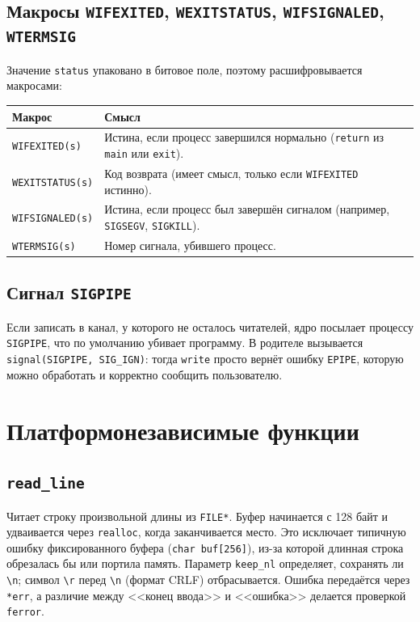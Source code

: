\documentclass[11pt, a4paper]{article}
\begin{document}
\subsection{Макросы \texttt{WIFEXITED}, \texttt{WEXITSTATUS}, \texttt{WIFSIGNALED}, \texttt{WTERMSIG}}

Значение \texttt{status} упаковано в битовое поле, поэтому расшифровывается
макросами:

\begin{center}
\begin{tabular}{@{}p{4.3cm}p{10cm}@{}}
\toprule
\textbf{Макрос} & \textbf{Смысл}\\
\midrule
\texttt{WIFEXITED(s)} & Истина, если процесс завершился нормально (\texttt{return} из \texttt{main} или \texttt{exit}).\\
\texttt{WEXITSTATUS(s)} & Код возврата (имеет смысл, только если \texttt{WIFEXITED} истинно).\\
\texttt{WIFSIGNALED(s)} & Истина, если процесс был завершён сигналом (например, \texttt{SIGSEGV}, \texttt{SIGKILL}).\\
\texttt{WTERMSIG(s)} & Номер сигнала, убившего процесс.\\
\bottomrule
\end{tabular}
\end{center}

\subsection{Сигнал \texttt{SIGPIPE}}

Если записать в канал, у которого не осталось читателей, ядро посылает
процессу \texttt{SIGPIPE}, что по умолчанию убивает программу. В родителе
вызывается \texttt{signal(SIGPIPE, SIG\_\allowbreak{}IGN)}: тогда \texttt{write} просто
вернёт ошибку \texttt{EPIPE}, которую можно обработать и корректно
сообщить пользователю.

\section{Платформонезависимые функции}

\subsection{\texttt{read\_line}}

Читает строку произвольной длины из \texttt{FILE*}. Буфер начинается с 128
байт и удваивается через \texttt{realloc}, когда заканчивается место. Это
исключает типичную ошибку фиксированного буфера (\texttt{char buf[256]}),
из-за которой длинная строка обрезалась бы или портила память. Параметр
\texttt{keep\_\allowbreak{}nl} определяет, сохранять ли \texttt{\textbackslash n}; символ
\texttt{\textbackslash r} перед \texttt{\textbackslash n} (формат CRLF)
отбрасывается. Ошибка передаётся через \texttt{*err}, а различие между
<<конец ввода>> и <<ошибка>> делается проверкой \texttt{ferror}.
\end{document}
